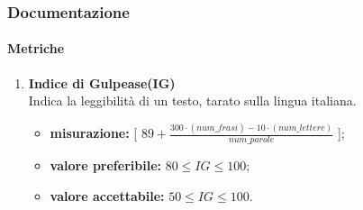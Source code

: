 \subsubsection{Documentazione}
\paragraph{Metriche}
\begin{enumerate}
	\item[]
	      \textbf{Indice di Gulpease(IG)}\\
	      Indica la leggibilità di un testo, tarato sulla lingua italiana.
	      \begin{itemize}
		      \item \textbf{misurazione:} [ $89+ \frac{300\cdot (num\_frasi) - 10\cdot (num\_lettere)}{num\_parole}$ ];
		      \item \textbf{valore preferibile:} $80\leq IG\leq 100$;
		      \item \textbf{valore accettabile:} $50\leq IG\leq 100$.
	      \end{itemize}
\end{enumerate}
\pagebreak
